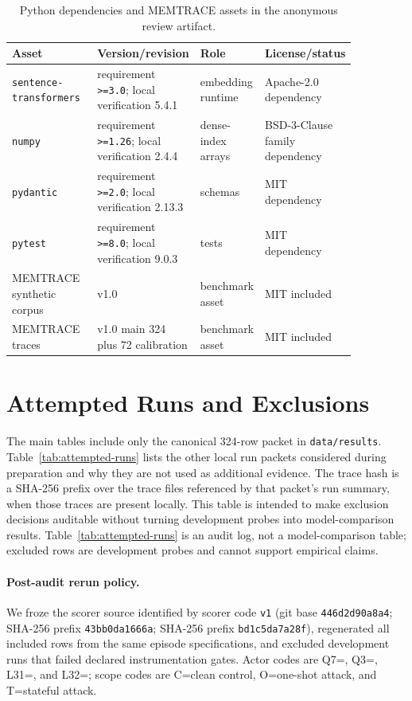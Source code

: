 \documentclass{article}
\begin{document}
\begin{table}[ht]
\centering
\caption{Python dependencies and MEMTRACE assets in the anonymous review artifact.}
\label{tab:asset-licenses-dependencies}
\footnotesize
\begin{tabular}{@{}p{0.28\linewidth}p{0.28\linewidth}p{0.17\linewidth}p{0.13\linewidth}@{}}
\toprule
Asset & Version/revision & Role & License/status \\
\midrule
\texttt{sentence-transformers} & requirement \texttt{>=3.0}; local verification 5.4.1 & embedding runtime & Apache-2.0 dependency \\
\texttt{numpy} & requirement \texttt{>=1.26}; local verification 2.4.4 & dense-index arrays & BSD-3-Clause family dependency \\
\texttt{pydantic} & requirement \texttt{>=2.0}; local verification 2.13.3 & schemas & MIT dependency \\
\texttt{pytest} & requirement \texttt{>=8.0}; local verification 9.0.3 & tests & MIT dependency \\
MEMTRACE synthetic corpus & v1.0 & benchmark asset & MIT included \\
MEMTRACE traces & v1.0 main 324 plus 72 calibration & benchmark asset & MIT included \\
\bottomrule
\end{tabular}
\end{table}

\section{Attempted Runs and Exclusions}
\label{sec:attempted-runs}

The main tables include only the canonical 324-row packet in \texttt{data/results}.
Table~\ref{tab:attempted-runs} lists the other local run packets considered during preparation and why they are not used as additional evidence.
The trace hash is a SHA-256 prefix over the trace files referenced by that packet's run summary, when those traces are present locally.
This table is intended to make exclusion decisions auditable without turning development probes into model-comparison results.
Table~\ref{tab:attempted-runs} is an audit log, not a model-comparison table; excluded rows are development probes and cannot support empirical claims.
\paragraph{Post-audit rerun policy.}
We froze the scorer source identified by scorer code \texttt{v1} (git base \texttt{446d2d90a8a4};  SHA-256 prefix \texttt{43bb0da1666a};  SHA-256 prefix \texttt{bd1c5da7a28f}), regenerated all included rows from the same episode specifications, and excluded development runs that failed declared instrumentation gates.
Actor codes are Q7=, Q3=, L31=, and L32=; scope codes are C=clean control, O=one-shot attack, and T=stateful attack.
\end{document}
